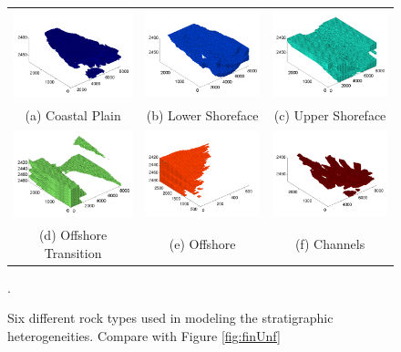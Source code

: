 \begin{figure}
\begin{tabular}{ccc}
\includegraphics[width=0.3 \linewidth,natwidth=542bp,natheight=401bp]{./figurer/facies_1.pdf}&
\includegraphics[width=0.3 \linewidth,natwidth=524bp,natheight=397bp]{./figurer/facies_2.pdf}&
\includegraphics[width=0.3 \linewidth,natwidth=524bp,natheight=397bp]{./figurer/facies_3.pdf}\\(a) Coastal Plain&(b) Lower Shoreface&(c) Upper Shoreface\\
\includegraphics[width=0.3 \linewidth,natwidth=524bp,natheight=397bp]{./figurer/facies_4.pdf}&
\includegraphics[width=0.3 \linewidth,natwidth=553bp,natheight=411bp]{./figurer/facies_5.pdf}&
\includegraphics[width=0.3 \linewidth,natwidth=542bp,natheight=399bp]{./figurer/facies_6.pdf}\\(d) Offshore Transition&(e) Offshore&(f) Channels
\end{tabular}
\caption{Six different rock types used in modeling the stratigraphic heterogeneities. Compare with Figure \ref{fig:finUnf}}.
\label{fig:facies}
\end{figure}

